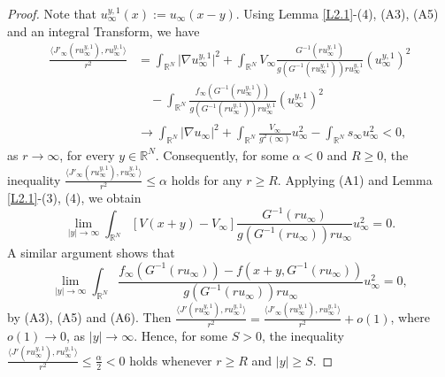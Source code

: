 \documentclass[reqno]{amsart}
\begin{document}
\begin{proof} 
Note that $u_{\infty}^{y,1}(x):=u_{\infty}(x-y)$. Using Lemma \ref{L2.1}-(4), (A3), (A5) and an 
integral Transform, we have
\begin{align*}
\frac{\langle J'_{\infty}(ru_{\infty}^{y,1}),ru_{\infty}^{y,1}\rangle}{r^{2}} 
&= \int_{\mathbb{R}^{N}} \vert \nabla u_{\infty}^{y,1} \vert^{2} + \int_{\mathbb{R}^{N}} V_{\infty} \frac{G^{-1}(ru_{\infty}^{y,1})}{g(G^{-1}(ru_{\infty}^{y,1}))ru_{\infty}^{y,1}} (u_{\infty}^{y,1})^{2} \\
&\quad - \int_{\mathbb{R}^{N}}  \frac{f_\infty (G^{-1}(ru_{\infty}^{y,1}))}{g(G^{-1}(ru_{\infty}^{y,1}))ru_{\infty}^{y,1}} (u_{\infty}^{y,1})^{2} \\
&\to \int_{\mathbb{R}^{N}} \vert \nabla u_{\infty} \vert^{2} +\int_{\mathbb{R}^{N}} \frac{V_{\infty} }{g^2(\infty)}u_{\infty}^{2}- \int_{\mathbb{R}^{N}} s_{\infty} u_{\infty}^{2} < 0,
\end{align*}
as $r\to\infty$, for every $y\in{\mathbb{R}^N}$.  Consequently, for some $\alpha<0$ and $R\geq0$, 
the inequality $\frac{\langle J'_{\infty}(ru_{\infty}^{y,1}),ru_{\infty}^{y,1}\rangle}{r^{2}}\leq \alpha$ 
holds for any $r\geq R$.  Applying  (A1) and Lemma \ref{L2.1}-(3), (4), we obtain
$$
\lim_{|y|\to\infty} \int_{\mathbb{R}^{N}} [V(x+y)-V_{\infty}]\frac{G^{-1}(ru_{\infty})}{g(G^{-1}(ru_{\infty}))ru_{\infty}} u_{\infty}^{2}=0.
$$
A similar argument shows that 
$$
\lim_{|y|\to\infty}  \int_{\mathbb{R}^{N}}  \frac{f_\infty (G^{-1}(ru_{\infty}))-f(x+y,G^{-1}(ru_{\infty}))}{g(G^{-1}(ru_{\infty}))ru_{\infty}} u_{\infty}^{2} =0,
$$
by (A3), (A5) and  (A6). 
Then $\frac{\langle J'(ru_{\infty}^{y,1}),ru_{\infty}^{y,1}\rangle}{r^{2}}
=\frac{\langle J'_{\infty}(ru_{\infty}^{y,1}),ru_{\infty}^{y,1}\rangle}{r^{2}}+o(1)$, 
where $o(1)\to 0$, as $|y|\to\infty$. Hence, for some $S>0$, the inequality 
$\frac{\langle J'(ru_{\infty}^{y,1}),ru_{\infty}^{y,1}\rangle}{r^{2}}\leq\frac{\alpha}{2}<0$ 
holds whenever $r\geq R$ and $|y|\geq S$.


\end{proof}
\end{document}
